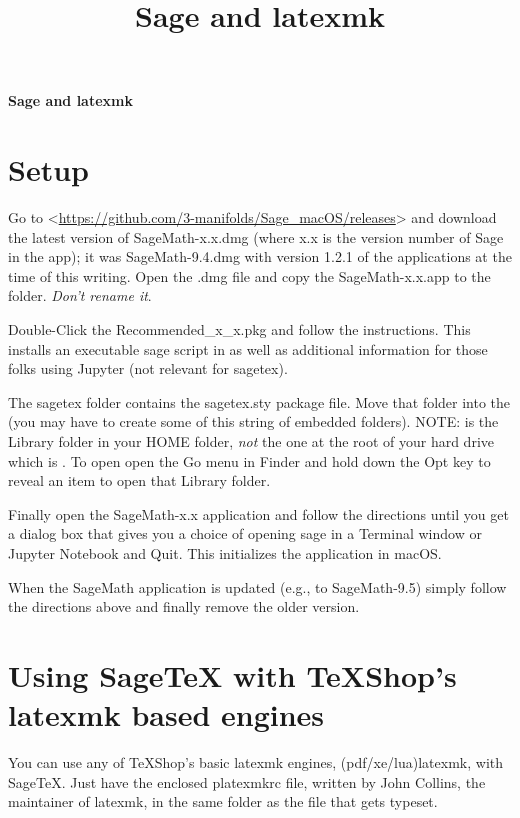 \documentclass[11pt, oneside]{amsart}
\title{\textsf{Sage} and \textsf{latexmk}}
\author{}
\newcommand{\TS}{\textsf{\TeX Shop}}
\begin{document}
\begin{center}
\Large\bfseries\textsf{Sage} and \textsf{latexmk}
\end{center}

\section{Setup}

Go to <\url{https://github.com/3-manifolds/Sage_macOS/releases}> and download the latest version of \textsf{SageMath-x.x.dmg} (where x.x is the version number of \textsf{Sage} in the app); it was \textsf{SageMath-9.4.dmg} with version 1.2.1 of the applications at the time of this writing. Open the \textsf{.dmg} file and copy the \textsf{SageMath-x.x.app} to the  folder. \emph{Don't rename it}.

Double-Click the \textsf{Recommended\_x\_x.pkg} and follow the instructions. This installs an executable \textsf{sage} script in  as well as additional information for those folks using \textsf{Jupyter} (not relevant for \textsf{sagetex}).

The \textsf{sagetex} folder contains the \textsf{sagetex.sty} package file. Move that folder into the  (you may have to create some of this string of embedded folders). NOTE:  is the \textsf{Library} folder in your \textsf{HOME} folder, \emph{not} the one at the root of your hard drive which is . To open  open the \textsf{Go} menu in \textsf{Finder} and hold down the \textsf{Opt} key to reveal an item to open that \textsf{Library} folder.

Finally open the \textsf{SageMath-x.x} application and follow the directions until you get a dialog box that gives you a choice of opening sage in a \textsf{Terminal} window or \textsf{Jupyter Notebook} and \textsf{Quit}. This initializes the application in \textsf{macOS}.

When the \textsf{SageMath} application is updated (e.g., to \textsf{SageMath-9.5}) simply follow the directions above and finally remove the older version.

\section{Using \textsf{SageTeX} with \TS's \textsf{latexmk} based engines}

You can use any of \TS's basic \textsf{latexmk} engines, \textsf{(pdf/xe/lua)latexmk}, with \textsf{SageTeX}. Just have the enclosed \textsf{platexmkrc} file, written by John Collins, the maintainer of \textsf{latexmk}, in the same folder as the file that gets typeset.
\end{document}
